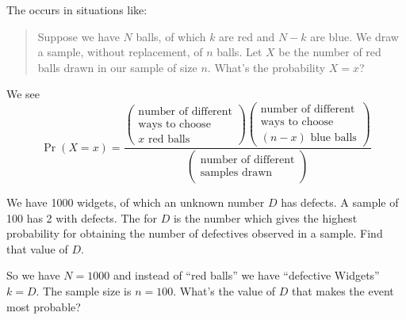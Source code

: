 \M
The  occurs in situations like:
\begin{quote}
Suppose we have $N$ balls, of which $k$ are red and $N-k$ are blue. We
draw a sample, without replacement, of $n$ balls. Let $X$ be the number
of red balls drawn in our sample of size $n$. What's the probability
$X=x$?
\end{quote}
We see
\begin{equation}
\Pr(X=x)=\frac{\begin{pmatrix}\mbox{number of different}\\
\mbox{ways to choose}\\
\mbox{$x$ red balls}
\end{pmatrix}
\begin{pmatrix}
\mbox{number of different}\\
\mbox{ways to choose}\\
\mbox{$(n-x)$ blue balls}
\end{pmatrix}}{\begin{pmatrix}\mbox{number of different}\\
\mbox{samples drawn}
  \end{pmatrix}}
\end{equation}

We have 1000 widgets, of which an unknown number $D$ has defects. A
sample of 100 has 2 with defects. The 
for $D$ is the number which gives the highest probability for obtaining
the number of defectives observed in a sample. Find that value of $D$.

So we have $N=1000$ and instead of ``red balls'' we have ``defective
Widgets'' $k=D$. The sample size is $n=100$. What's the value of $D$
that makes the event most probable?

